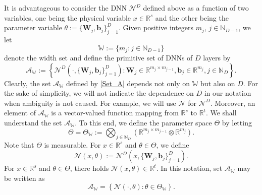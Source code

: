\documentclass[11pt]{article}
\begin{document}
%
It is advantageous to consider the DNN $\mathcal{N}^D$ defined above as a function of two variables, one being the physical variable $x\in \mathbb{R}^s$ and the other being the parameter variable $\theta:=\{\mathbf{W}_j,\mathbf{b}_j\}_{j=1}^D$.
Given positive integers $m_j$, $j\in \mathbb{N}_{D-1}$, %
we let
\begin{equation}\label{width-set}
    \mathbb{W}:=\{m_j: j\in\mathbb{N}_{D-1}\}
\end{equation} 
denote the width set  and 
define the primitive set of DNNs of $D$ layers by
\begin{equation}\label{Set_A}
    \mathcal{A}_{\mathbb{W}}:=\left\{ \mathcal{N}^D(\cdot,\{\mathbf{W}_j,\mathbf{b}_j\}_{j=1}^D): \mathbf{W}_j\in \mathbb{R}^{m_j\times m_{j-1}},  \mathbf{b}_j\in\mathbb{R}^{m_j}, j\in\mathbb{N}_D\right\}.
\end{equation}
%
%
%
Clearly, the set $\mathcal{A}_{\mathbb{W}}$ defined by \eqref{Set_A} depends not only on $\mathbb{W}$ but also on $D$. For the sake of simplicity, we will not indicate the dependence on $D$ in our notation when ambiguity is not caused. For example, we will use $\mathcal{N}$ for $\mathcal{N}^D$.
Moreover, an element of $\mathcal{A}_{\mathbb{W}}$ is a vector-valued function mapping from $\mathbb{R}^s$ to  $\mathbb{R}^t$. We shall understand the set $\mathcal{A}_{\mathbb{W}}$. To this end,
we define the parameter space $\Theta$ by letting
\begin{equation}\label{Def:Theta}
\Theta=\Theta_{\mathbb{W}}:= \bigotimes_{j\in\mathbb{N}_D}(\mathbb{R}^{m_j\times m_{j-1}}\otimes \mathbb{R}^{m_j}).
\end{equation}
Note that $\Theta$ is measurable. 
For ${x}\in \mathbb{R}^s$ and $\theta\in \Theta$, we define
\begin{equation}\label{Def:kernel}
    \mathcal{N}({x},\theta):=\mathcal{N}^D({x},\{\mathbf{W}_j,\mathbf{b}_j\}_{j=1}^D).
\end{equation}
For ${x}\in \mathbb{R}^s$ and $\theta\in \Theta$, there holds $\mathcal{N}({x},\theta)\in \mathbb{R}^t$. In this notation, set $\mathcal{A}_{\mathbb{W}}$ may be written as
\begin{equation*}\label{Set_A*}
    \mathcal{A}_{\mathbb{W}}=\left\{ \mathcal{N}(\cdot,\theta): \theta\in \Theta_{\mathbb{W}} \right\}.
\end{equation*}
%
\end{document}
